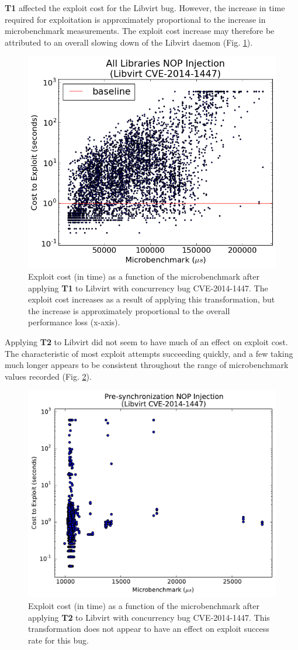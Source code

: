 \textbf{T1} affected the exploit cost for the Libvirt bug.
However, the increase in time required for exploitation is approximately proportional to the increase in microbenchmark measurements.
The exploit cost increase may therefore be attributed to an overall slowing down of the Libvirt daemon (Fig. \ref{fig_libvirt-all}).
\begin{figure}
	\centering
	\includegraphics[width=.75\columnwidth]{figures/libvirt-all}
	\caption{
		Exploit cost (in time) as a function of the microbenchmark after applying \textbf{T1} to Libvirt with concurrency bug CVE-2014-1447.
		The exploit cost increases as a result of applying this transformation, but the increase is approximately proportional to the overall performance loss (x-axis).
	}
	\label{fig_libvirt-all}
\end{figure}

Applying \textbf{T2} to Libvirt did not seem to have much of an effect on exploit cost.
The characteristic of most exploit attempts succeeding quickly, and a few taking much longer appears to be consistent throughout the range of microbenchmark values recorded (Fig. \ref{fig_libvirt-pre}).
\begin{figure}
	\centering
	\includegraphics[width=.75\columnwidth]{figures/libvirt-pre}
	\caption{
		Exploit cost (in time) as a function of the microbenchmark after applying \textbf{T2} to Libvirt with concurrency bug CVE-2014-1447.
		This transformation does not appear to have an effect on exploit success rate for this bug.
	}
	\label{fig_libvirt-pre}
\end{figure}

